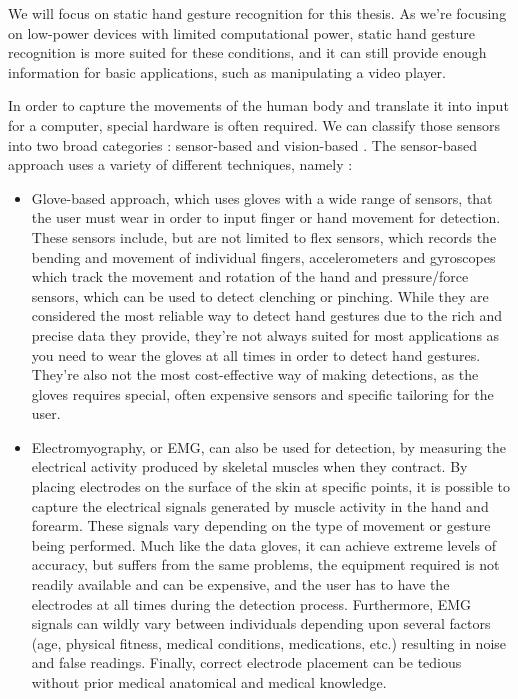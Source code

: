 \documentclass[12pt]{article}
\begin{document}
  We will focus on static hand gesture recognition for this thesis. As we're focusing on low-power devices with limited computational power, static hand gesture recognition is more suited for these conditions, and it can still provide enough information for basic applications, such as manipulating a video player.

  In order to capture the movements of the human body and translate it into input for a computer, special hardware is often required. We can classify those sensors into two broad categories : sensor-based and vision-based \cite{qi2024computer}.
  The sensor-based approach uses a variety of different techniques, namely :
  \begin{itemize}
    \item Glove-based approach, which uses gloves with a wide range of sensors, that the user must wear in order to input finger or hand movement for detection. These sensors include, but are not limited to flex sensors, which records the bending and movement of individual fingers, accelerometers and gyroscopes which track the movement and rotation of the hand and pressure/force sensors, which can be used to detect clenching or pinching. While they are considered the most reliable way to detect hand gestures due to the rich and precise data they provide, they're not always suited for most applications as you need to wear the gloves at all times in order to detect hand gestures. They're also not the most cost-effective way of making detections, as the gloves requires special, often expensive sensors and specific tailoring for the user.
    \item Electromyography, or EMG, can also be used for detection, by measuring the electrical activity produced by skeletal muscles when they contract. By placing electrodes on the surface of the skin at specific points, it is possible to capture the electrical signals generated by muscle activity in the hand and forearm. These signals vary depending on the type of movement or gesture being performed. Much like the data gloves, it can achieve extreme levels of accuracy, but suffers from the same problems, the equipment required is not readily available and can be expensive, and the user has to have the electrodes at all times during the detection process. Furthermore, EMG signals can wildly vary between individuals depending upon several factors (age, physical fitness, medical conditions, medications, etc.) resulting in noise and false readings. Finally, correct electrode placement can be tedious without prior medical anatomical and medical knowledge.

\end{itemize}
\end{document}
